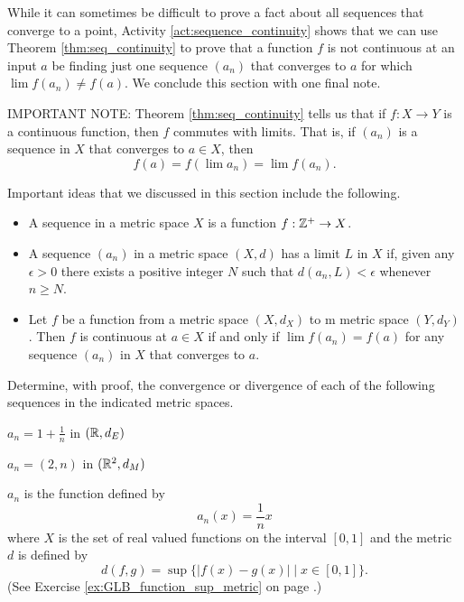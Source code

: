 While it can sometimes be difficult to prove a fact about all sequences that converge to a point, Activity \ref{act:sequence_continuity} shows that we can use Theorem \ref{thm:seq_continuity} to prove that a function $f$ is not continuous at an input $a$ be finding just one sequence $(a_n)$ that converges to $a$ for which $\lim f(a_n) \neq f(a)$. We conclude this section with one final note. 

\noindent IMPORTANT NOTE: Theorem \ref{thm:seq_continuity} tells us that if $f : X \to Y$ is a continuous function, then $f$ commutes with limits. That is, if $(a_n)$ is a sequence in $X$ that converges to $a \in X$, then 
\[f(a) = f(\lim a_n) = \lim f(a_n).\]


 \label{sec_seq_summ}
Important ideas that we discussed in this section include the following.
\begin{itemize}
\item A sequence in a metric space $X$ is a function $f : \mathbb{Z}^+ \to X$.
\item  A sequence $(a_n)$ in a metric space $(X,d)$ has a limit $L$ in $X$ if, given any $\epsilon > 0$ there exists a positive integer $N$ such that $d(a_n,L) < \epsilon$ whenever $n \geq N$.
\item Let $f$ be a function from a metric space $(X,d_X)$ to m metric space $(Y,d_Y)$. Then $f$ is continuous at $a \in X$ if and only if $\lim f(a_n) = f(a)$ for any sequence $(a_n)$ in $X$ that converges to $a$.
\end{itemize}

\label{sec_seq_exer}

\be

\item Determine, with proof, the convergence or divergence of each of the following sequences in the indicated metric spaces.

\ba

\item $a_n = 1+\frac{1}{n}$ in $(\mathbb{R}, d_E)$

\item $a_n = (2,n)$ in $(\mathbb{R}^2, d_M)$

\item $a_n$ is the function defined by 
\[a_n(x) = \frac{1}{n}x\]
where $X$ is the set of real valued functions on the interval $[0,1]$ and the metric $d$ is defined by 
\[d(f,g) = \sup\{|f(x)-g(x)| \mid x \in [0,1]\}.\]
(See Exercise \ref{ex:GLB_function_sup_metric} on page \pageref{ex:GLB_function_sup_metric}.)



